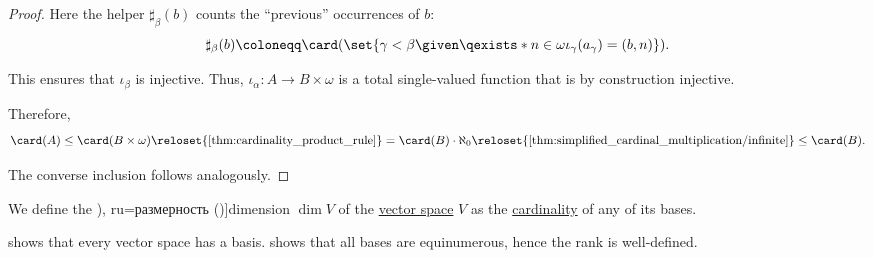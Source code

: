 \begin{proof}
  Here the helper \( \sharp_\beta(b) \) counts the \enquote{previous} occurrences of \( b \):
  \begin{equation*}
    \sharp_\beta(b) \coloneqq \card(\set{ \gamma < \beta \given \qexists* {n \in \omega} \iota_\gamma(a_\gamma) = (b, n) }).
  \end{equation*}

  This ensures that \( \iota_\beta \) is injective. Thus, \( \iota_\alpha: A \to B \times \omega \) is a total single-valued function that is by construction injective.

  Therefore,
  \begin{equation*}
    \card(A)
    \leq
    \card(B \times \omega)
    \reloset {\ref{thm:cardinality_product_rule}} =
    \card(B) \cdot \aleph_0
    \reloset {\ref{thm:simplified_cardinal_multiplication/infinite}} \leq
    \card(B).
  \end{equation*}

  The converse inclusion follows analogously.
\end{proof}

\begin{definition}\label{def:vector_space_dimension}\mimprovised
  We define the \term[bg=размерност (\cite[216]{Станилов1974АналитичнаГеометрия}), ru=размерность (\cite[sec. 3.7]{Тыртышников2007ЛинейнаяАлгебра})]{dimension} \( \dim V \) of the \hyperref[def:vector_space]{vector space} \( V \) as the \hyperref[def:cardinality]{cardinality} of any of its bases.
\end{definition}
\begin{defproof}
   shows that every vector space has a basis.  shows that all bases are equinumerous, hence the rank is well-defined.
\end{defproof}

